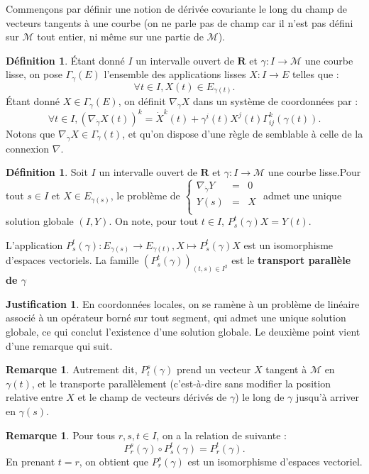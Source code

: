 \documentclass[12pt,a4paper]{article}
\theoremstyle{definition}
\newtheorem{defn}[thm]{Définition}
\newtheorem{rqe}[thm]{Remarque}
\newtheorem*{just}{Justification}
\begin{document}
Commençons par définir une notion de dérivée covariante le long du \og champ \fg{} de vecteurs tangents à une courbe (on ne parle pas de champ car il n'est pas défini sur $\mathcal{M}$ tout entier, ni même sur une partie de $\mathcal{M}$). 
\begin{defn}
Étant donné $I$ un intervalle ouvert de $\mathbf{R}$ et $\gamma:I\to\mathcal{M}$ une courbe lisse, on pose $\Gamma_\gamma(E)$ l'ensemble des applications lisses $X:I\to E$ telles que :$$\forall t\in I, X(t)\in E_{\gamma(t)}.$$
Étant donné $X\in\Gamma_{\gamma}(E)$, on définit $\nabla_{\dot{\gamma}}X$ dans un système de coordonnées par :
$$
\forall t\in I, (\nabla_{\dot{\gamma}}X(t))^k=\dot{X}^k(t)+\gamma^i(t)X^j(t)\Gamma_{ij}^k(\gamma(t)).
$$
Notons que $\nabla_{\dot{\gamma}}X\in\Gamma_\gamma(t)$, et qu'on dispose d'une règle de  semblable à celle de la connexion $\nabla$.
\end{defn}
\begin{defn}
Soit $I$ un intervalle ouvert de $\mathbf{R}$ et $\gamma:I\to\mathcal{M}$ une courbe lisse.\newline Pour tout $s\in I$ et $X\in E_{\gamma (s)}$, le problème de  $\left \{
\begin{array}{rcl}
\nabla_{\dot{\gamma}}Y &=&0 \\
Y(s)&=&X\\
\end{array}
\right.$ admet une unique solution globale $(I,Y)$. On note, pour tout $t\in I$, $P_s^t(\gamma)X=Y(t)$.\newline

L'application $P_s^t(\gamma):E_{\gamma(s)}\to E_{\gamma(t)},X\mapsto P_s^t(\gamma)X$ est un isomorphisme d'espaces vectoriels. La famille $(P_{s}^t(\gamma))_{(t,s)\in I^2}$ est le \textbf{transport parallèle de $\gamma$}
\end{defn}
\begin{just}
En coordonnées locales, on se ramène à un problème de  linéaire associé à un opérateur borné sur tout segment, qui admet une unique solution globale, ce qui conclut l'existence d'une solution globale. Le deuxième point vient d'une remarque qui suit.
\end{just}
\begin{rqe}
Autrement dit, $P_t^s(\gamma)$ prend un vecteur $X$ tangent à $\mathcal{M}$ en $\gamma(t)$, et le transporte parallèlement (c'est-à-dire sans modifier la position relative entre $X$ et le champ de vecteurs dérivés de $\gamma$) le long de $\gamma$ jusqu'à arriver en $\gamma(s)$.
\end{rqe}
\begin{rqe}
Pour tous $r,s,t\in I$, on a la relation de  suivante :
$$P_r^s(\gamma)\circ P_s^t(\gamma)=P_r^t(\gamma).$$
En prenant $t=r$, on obtient que $P_r^s(\gamma)$ est un isomorphisme d'espaces vectoriel.
\end{rqe}
\newpage
\end{document}
